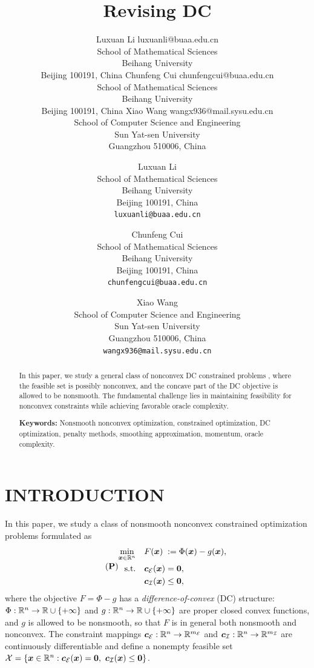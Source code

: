 \documentclass[english]{article}
\title{\LARGE \bf
Revising DC 
}
\author{\name Luxuan Li \email luxuanli@buaa.edu.cn \\
       \addr School of Mathematical Sciences\\
       Beihang University\\
       Beijing 100191, China
       \AND
       \name Chunfeng Cui \email chunfengcui@buaa.edu.cn \\
       \addr School of Mathematical Sciences\\
       Beihang University\\
       Beijing 100191, China
       \AND
       \name Xiao Wang \email wangx936@mail.sysu.edu.cn \\
       \addr School of Computer Science and Engineering\\
       Sun Yat-sen University\\
       Guangzhou 510006, China}
\author{
       Luxuan Li\\
       School of Mathematical Sciences\\
       Beihang University\\
       Beijing 100191, China\\
       \texttt{luxuanli@buaa.edu.cn}
       \and
       Chunfeng Cui\\
       School of Mathematical Sciences\\
       Beihang University\\
       Beijing 100191, China\\
       \texttt{chunfengcui@buaa.edu.cn}
       \and
       Xiao Wang\\
       School of Computer Science and Engineering\\
       Sun Yat-sen University\\
       Guangzhou 510006, China\\
       \texttt{wangx936@mail.sysu.edu.cn}
       }
\newif\ifjmlrformat
\begin{document}
\maketitle


\begin{abstract}
In this paper, we study a general class of nonconvex DC constrained problems , where the feasible set is possibly nonconvex, and the concave part of the DC objective is allowed to be nonsmooth. The fundamental challenge lies in maintaining feasibility for nonconvex constraints while achieving favorable oracle complexity.

\ifjmlrformat
\begin{keywords}
Nonsmooth optimization, DC optimization, constrained optimization, penalty methods, smoothing approximation, momentum, oracle complexity
\end{keywords}
\else
\noindent\textbf{Keywords:} Nonsmooth nonconvex optimization,  constrained optimization, DC optimization, penalty methods, smoothing approximation, momentum, oracle complexity.
\fi


\end{abstract}



\section{INTRODUCTION}
In this paper, we study a class of nonsmooth nonconvex constrained
optimization problems formulated as
\begin{equation}
\tag{{\bf P}}
\label{prob:main}
\begin{alignedat}{3}
   \min\limits_{\bx \in \RR^n} \quad
      & F(\bx) &&:= \Phi(\bx) - g(\bx),\\
   \text{s.t.} \quad
      & \bc_{\calE}(\bx) &&= \zero, \\
      & \bc_{\calI}(\bx) &&\leq \zero ,
\end{alignedat}
\end{equation}
where the objective $F = \Phi - g$ has a \emph{difference-of-convex}
(DC) structure: $\Phi:\mathbb{R}^n\to\mathbb{R}\cup\{+\infty\}$ and
$g:\mathbb{R}^n\to\mathbb{R}\cup\{+\infty\}$ are proper closed convex functions, and
$g$ is allowed to be nonsmooth, so that $F$ is in general both
nonsmooth and nonconvex. The constraint mappings
$\bm{c}_{\mathcal{E}}:\mathbb{R}^n\to\mathbb{R}^{m_{\mathcal{E}}}$ and
$\bm{c}_{\mathcal{I}}:\mathbb{R}^n\to\mathbb{R}^{m_{\mathcal{I}}}$ are continuously differentiable
and define a nonempty feasible set
$\mathcal{X} = \{\bm{x} \in \mathbb{R}^n : \bm{c}_{\mathcal{E}}(\bm{x}) = \bm{0},\
\bm{c}_{\mathcal{I}}(\bm{x}) \le \bm{0}\}$.
\end{document}

